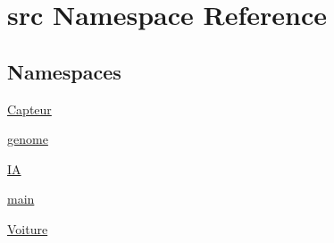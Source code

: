 \hypertarget{namespacesrc}{}\section{src Namespace Reference}
\label{namespacesrc}
\subsection*{Namespaces}
\begin{DoxyCompactItemize}
\item 
 \hyperlink{namespacesrc_1_1_capteur}{Capteur}
\item 
 \hyperlink{namespacesrc_1_1genome}{genome}
\item 
 \hyperlink{namespacesrc_1_1_i_a}{IA}
\item 
 \hyperlink{namespacesrc_1_1main}{main}
\item 
 \hyperlink{namespacesrc_1_1_voiture}{Voiture}
\end{DoxyCompactItemize}
